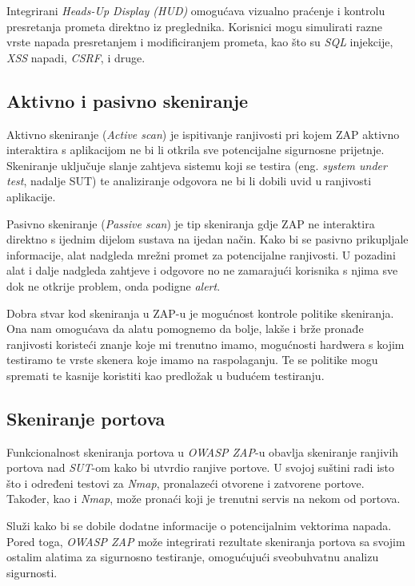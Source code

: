 Integrirani \textit{Heads-Up Display (HUD)} omogućava vizualno praćenje i kontrolu presretanja 
prometa direktno iz preglednika. Korisnici mogu simulirati razne vrste napada presretanjem i 
modificiranjem prometa, kao što su \textit{SQL} injekcije, \textit{XSS} napadi, \textit{CSRF}, i 
druge.\cite{ZAP_docs,zap_feat}


\subsection{Aktivno i pasivno skeniranje}%
Aktivno skeniranje (\textit{Active scan}) je ispitivanje ranjivosti pri kojem ZAP aktivno interaktira s aplikacijom ne bi li 
otkrila sve potencijalne sigurnosne prijetnje. Skeniranje uključuje slanje zahtjeva sistemu koji se testira (eng. \textit{system under test}, 
nadalje SUT) te analiziranje odgovora ne bi li dobili uvid u ranjivosti aplikacije.

Pasivno skeniranje (\textit{Passive scan}) je tip skeniranja gdje ZAP ne interaktira direktno s ijednim dijelom sustava na ijedan način.
Kako bi se pasivno prikupljale informacije, alat nadgleda mrežni promet za potencijalne ranjivosti. U pozadini alat i dalje nadgleda zahtjeve 
i odgovore no ne zamarajući korisnika s njima sve dok ne otkrije problem, onda podigne \textit{alert}.

Dobra stvar kod skeniranja u ZAP-u je mogućnost kontrole politike skeniranja. Ona nam omogućava da alatu pomognemo da bolje, lakše i brže pronađe ranjivosti koristeći 
znanje koje mi trenutno imamo, mogućnosti hardwera s kojim testiramo te vrste skenera koje imamo na raspolaganju. Te se politike mogu spremati te kasnije koristiti kao 
predložak u budućem testiranju.\cite{ZAP_docs,zap_feat}

\subsection{Skeniranje portova} %
Funkcionalnost skeniranja portova u \textit{OWASP ZAP}-u obavlja skeniranje ranjivih portova nad \textit{SUT}-om kako bi utvrdio 
ranjive portove. U svojoj suštini radi isto što i određeni testovi za \textit{Nmap}\cite{nmap}, pronalazeći otvorene i zatvorene 
portove. Također, kao i \textit{Nmap}, može pronaći koji je trenutni servis na nekom od portova.

Služi kako bi se dobile dodatne informacije o potencijalnim vektorima napada. Pored toga, \textit{OWASP ZAP} može integrirati 
rezultate skeniranja portova sa svojim ostalim alatima za sigurnosno testiranje, omogućujući sveobuhvatnu analizu sigurnosti.

